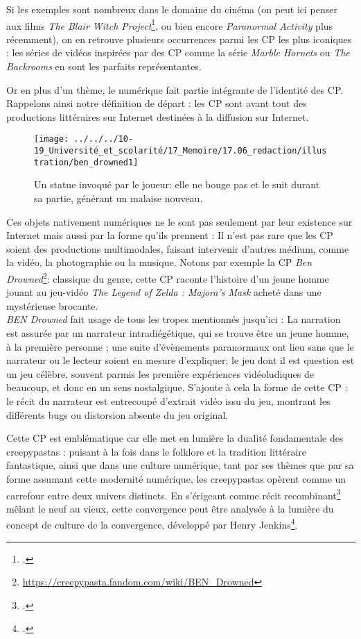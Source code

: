 \documentclass[12pt,a4paper,oneside,titlepage]{book} %
\begin{document}
Si les exemples sont nombreux dans le domaine du cinéma (on peut ici penser aux films \emph{The Blair Witch Project}\footcite{myrick_blair_1999}, ou bien encore \emph{Paranormal Activity} plus récemment), on en retrouve plusieurs occurrences parmi les CP les plus iconiques : les séries de vidéos inspirées par des CP comme la série \emph{Marble Hornets} ou\emph{ The Backrooms} en sont les parfaits représentantes.

Or en plus d’un thème, le numérique fait partie intégrante de l’identité des CP. Rappelons ainsi notre définition de départ : les CP sont avant tout des productions littéraires sur Internet destinées à la diffusion sur Internet. 
	\begin{wrapfigure}{r}{5cm}
	\centering
	\texttt{[image: ../../../10-19\_Université\_et\_scolarité/17\_Memoire/17.06\_redaction/illustration/ben\_drowned1]}
	\caption{\small Un statue invoqué par le joueur: elle ne bouge pas et le suit durant sa partie, générant un malaise nouveau.}
	\label{img:ben_drowned}
\end{wrapfigure}

Ces objets nativement numériques ne le sont pas seulement par leur existence sur Internet mais aussi par la forme qu’ils prennent : Il n’est pas rare que les CP soient des productions multimodales, faisant intervenir d’autres médium, comme la vidéo, la photographie ou la musique. Notons par exemple la CP \emph{Ben Drowned}\footnote{\url{https://creepypasta.fandom.com/wiki/BEN_Drowned}}: classique du genre, cette CP raconte l’histoire d’un jeune homme jouant au jeu-vidéo \emph{The Legend of Zelda : Majora's Mask} acheté dans une mystérieuse brocante. \\



\emph{BEN Drowned} fait usage de tous les tropes mentionnés jusqu'ici : La narration est assurée par un narrateur intradiégétique, qui se trouve être un jeune homme, à la première personne ;  une suite d'évènements paranormaux ont lieu sans que le narrateur ou le lecteur soient en mesure d'expliquer; le jeu dont il est question est un jeu célèbre, souvent parmis les première expériences vidéoludiques de beaucoup, et donc en un sens nostalgique.
S'ajoute à cela la forme de cette CP : le récit du narrateur est entrecoupé d'extrait vidéo issu du jeu, montrant les différents bugs ou distorsion absente du jeu original.

Cette CP est emblématique car elle met en lumière la dualité fondamentale des creepypastas : puisant à la fois dans le folklore et la tradition littéraire fantastique, ainsi que dans une culture numérique, tant par ses thèmes que par sa forme assumant cette modernité numérique, les creepypastas opèrent comme un carrefour entre deux univers distincts. En s'érigeant comme récit recombinant\footcite{jacobs_character_1990} mêlant le neuf au vieux, cette convergence peut être analysée à la lumière du concept de culture de la convergence, développé par Henry Jenkins\footcite{jenkins_convergence_2006}.
\end{document}
